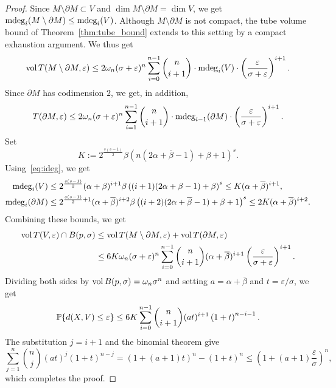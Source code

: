 \begin{proof}
Since $M \setminus \partial M \subset V$ and $\dim M \setminus \partial M = \dim V$, we get $\operatorname{\mathrm{mdeg}}_i(M\setminus \partial M) \leq \operatorname{\mathrm{mdeg}}_i(V)$. Although $M\setminus \partial M$ is not compact, the tube volume bound of Theorem~\ref{thm:tube_bound} extends to this setting by a compact exhaustion argument. We thus get
\begin{equation*}
  \operatorname{vol} T(M \setminus \partial M, \varepsilon)  \leq 2 \omega_n (\sigma+\varepsilon)^n\sum_{i=0}^{n-1} \binom{n}{i+1} \cdot \mathrm{mdeg}_i(V)\cdot \left(\frac{\varepsilon}{\sigma+\varepsilon}\right)^{i+1}.
\end{equation*}
Since $\partial M$ has codimension $2$, we get, in addition,
\begin{equation*}
  T(\partial M, \varepsilon) \leq 2 \omega_n (\sigma+\varepsilon)^{n}\sum_{i=1}^{n-1} \binom{n}{i+1} \cdot \operatorname{\mathrm{mdeg}}_{i-1}(\partial M)\cdot \left(\frac{\varepsilon}{\sigma+\varepsilon}\right)^{i+1}.
\end{equation*}
Set
\begin{equation*}
  K := 2^{\frac{s(s-1)}{2}}\beta\left(n(2\alpha+\overline{\beta}-1)+\beta+1\right)^s.
\end{equation*}
Using~\eqref{eq:ideg}, we get
\begin{align*}
\operatorname{\mathrm{mdeg}}_i(V) &\leq 2^{\frac{s(s-1)}{2}}(\alpha+\beta)^{i+1}\beta\left((i+1)(2\alpha+\beta-1)+\beta\right)^s\leq K (\alpha+\overline{\beta})^{i+1},\\
\operatorname{\mathrm{mdeg}}_i(\partial M) &\leq 2^{\frac{s(s-1)}{2}+1}(\alpha+\overline{\beta})^{i+2}\beta\left((i+2)(2\alpha+\overline{\beta}-1)+\beta+1\right)^s\leq 2K (\alpha+\overline{\beta})^{i+2}.
\end{align*}
Combining these bounds, we get
\begin{align*}
\operatorname{vol} T(V, \varepsilon) \cap B(p, \sigma) &\le \operatorname{vol} T(M \setminus \partial M, \varepsilon) + \operatorname{vol} T(\partial M, \varepsilon) \\
& \leq 6K\omega_n(\sigma+\varepsilon)^{n} \sum_{i=0}^{n-1}\binom{n}{i+1}(\alpha+\overline{\beta})^{i+1}\left(\frac{\varepsilon}{\sigma+\varepsilon}\right)^{i+1}.
\end{align*}
Dividing both sides by $\operatorname{vol} B(p, \sigma) = \omega_n \sigma^n$ and setting $a=\alpha+\overline{\beta}$ and $t=\varepsilon/\sigma$, we get
\begin{equation*}
\operatorname*{\mathbb{P}}\{d(X, V)\leq \varepsilon\} \leq 6K\sum_{i=0}^{n-1}\binom{n}{i+1}(at)^{i+1}\left(1+t\right)^{n-i-1}.
\end{equation*}
The substitution $j=i+1$ and the binomial theorem give
\begin{equation*}
  \sum_{j=1}^{n}\binom{n}{j}(at)^j(1+t)^{n-j} = (1+(a+1)t)^n - (1+t)^n \leq \left(1+(a+1)\frac{\varepsilon}{\sigma}\right)^n,
\end{equation*}
which completes the proof.
\end{proof}

